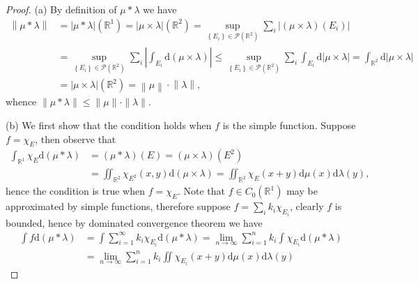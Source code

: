 \begin{proof}
(a) By definition of $\mu*\lambda$ we have 
$$
\begin{aligned}
\left\| \mu *\lambda \right\| &=\left| \mu *\lambda \right|\left( \mathbb{R} ^1 \right) =\left| \mu \times \lambda \right|\left( \mathbb{R} ^2 \right) =\mathop {\mathrm{sup}} \limits_{\left\{ E_i \right\} \in \mathcal{P} \left( \mathbb{R} ^2 \right)}\sum_i{\left| \left( \mu \times \lambda \right) \left( E_i \right) \right|}
\\
&=\mathop {\mathrm{sup}} \limits_{\left\{ E_i \right\} \in \mathcal{P} \left( \mathbb{R} ^2 \right)}\sum_i{\left| \int_{E_i}{\mathrm{d}\left( \mu \times \lambda \right)} \right|}\le \mathop {\mathrm{sup}} \limits_{\left\{ E_i \right\} \in \mathcal{P} \left( \mathbb{R} ^2 \right)}\sum_i{\int_{E_i}{\mathrm{d}\left| \mu \times \lambda \right|}}=\int_{\mathbb{R} ^2}{\mathrm{d}\left| \mu \times \lambda \right|}
\\
&=\left| \mu \times \lambda \right|\left( \mathbb{R} ^2 \right) =\left\| \mu \right\| \cdot \left\| \lambda \right\| ,
\end{aligned}
$$
whence $\|\mu*\lambda\|\le\|\mu\|\cdot\|\lambda\|$.\par
(b) We first show that the condition holds when $f$ is the simple function. Suppose $f=\chi_E$, then observe that 
$$
\begin{aligned}
\int_{\mathbb{R} ^1}{\chi _E\mathrm{d}\left( \mu *\lambda \right)}&=\left( \mu *\lambda \right) \left( E \right) =\left( \mu \times \lambda \right) \left( E^2 \right) 
\\
&=\iint_{\mathbb{R} ^2}{\chi _{E^2}\left( x,y \right) \mathrm{d}\left( \mu \times \lambda \right)}=\iint_{\mathbb{R} ^2}{\chi _E\left( x+y \right) \mathrm{d}\mu \left( x \right) \mathrm{d}\lambda \left( y \right)},
\end{aligned}
$$
hence the condition is true when $f=\chi_E$. Note that $f\in C_0(\mathbb{R}^1)$ may be approximated by simple functions, therefore suppose $f=\sum_ik_i\chi_{E_i}$, clearly $f$ is bounded, hence by dominated convergence theorem we have 
$$
\begin{aligned}
\int{f\mathrm{d}\left( \mu *\lambda \right)}&=\int{\sum_{i=1}^{\infty}{k_i\chi _{E_i}\mathrm{d}\left( \mu *\lambda \right)}}=\lim_{n\rightarrow \infty} \sum_{i=1}^n{k_i\int{\chi _{E_i}\mathrm{d}\left( \mu *\lambda \right)}}
\\
&=\lim_{n\rightarrow \infty} \sum_{i=1}^n{k_i\iint{\chi _{E_i}\left( x+y \right) \mathrm{d}\mu \left( x \right) \mathrm{d}\lambda \left( y \right)}}

\end{aligned}$$
\end{proof}
